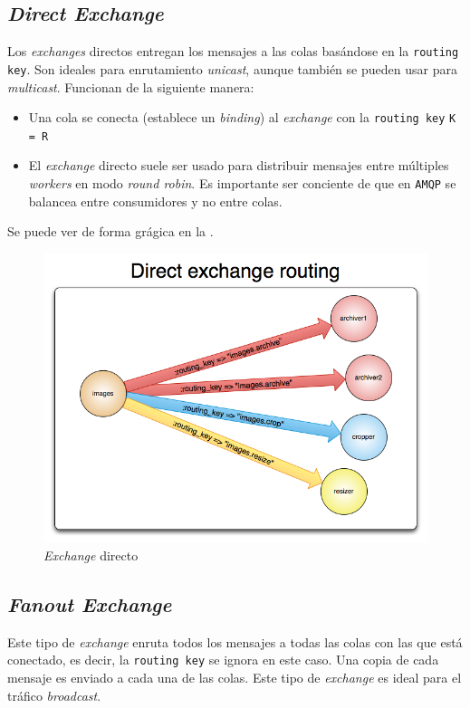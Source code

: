\subsection{\emph{Direct Exchange}}

Los \emph{exchanges} directos entregan los mensajes a las colas basándose en
la \texttt{routing key}. Son ideales para enrutamiento \emph{unicast}, aunque
también se pueden usar para \emph{multicast}. Funcionan de la siguiente manera:

\begin{itemize}\itemsep1pt \parskip0pt 
\item Una cola se conecta (establece un \emph{binding}) al \emph{exchange} con
la \texttt{routing key} \texttt{K = R}
\item El \emph{exchange} directo suele ser usado para distribuir mensajes entre
múltiples \emph{workers} en modo \emph{round robin}. Es importante ser conciente
de que en \texttt{AMQP} se balancea entre consumidores y no entre colas.
\end{itemize}

Se puede ver de forma grágica en la .

\begin{figure}[htbp]
\centering
\includegraphics[width=0.75\linewidth]{05-amqp/figuras/fig002}
\caption{\emph{Exchange} directo}
\label{fig:figura2}
\end{figure}

\subsection{\emph{Fanout Exchange}}

Este tipo de \emph{exchange} enruta todos los mensajes a todas las colas con las
que está conectado, es decir, la \texttt{routing key} se ignora en este caso.
Una copia de cada mensaje es enviado a cada una de las colas. Este tipo de
\emph{exchange} es ideal para el tráfico \emph{broadcast}.

